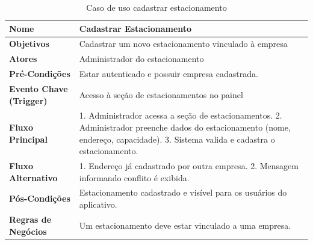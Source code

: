 \begin{table}[H]
\begin{center}
\caption{Caso de uso cadastrar estacionamento}
\label{tab:caso-uso-cadastrar-estacionamento}
\begin{tabular}{|p{4cm}|p{9cm}|}
\hline
\textbf{Nome} & Cadastrar Estacionamento \\
\hline
\textbf{Objetivos} & Cadastrar um novo estacionamento vinculado à empresa \\
\hline
\textbf{Atores} & Administrador do estacionamento \\
\hline
\textbf{Pré-Condições} & Estar autenticado e possuir empresa cadastrada. \\
\hline
\textbf{Evento Chave (Trigger)} & Acesso à seção de estacionamentos no painel \\
\hline
\textbf{Fluxo Principal} & 1. Administrador acessa a seção de estacionamentos. 2. Administrador preenche dados do estacionamento (nome, endereço, capacidade). 3. Sistema valida e cadastra o estacionamento. \\
\hline
\textbf{Fluxo Alternativo} & 1. Endereço já cadastrado por outra empresa. 2. Mensagem informando conflito é exibida. \\
\hline
\textbf{Pós-Condições} & Estacionamento cadastrado e visível para os usuários do aplicativo. \\
\hline
\textbf{Regras de Negócios} & Um estacionamento deve estar vinculado a uma empresa. \\
\hline
\end{tabular}
\end{center}
\end{table}

